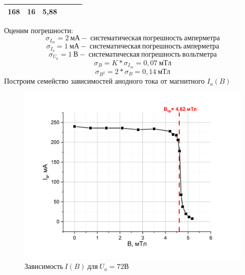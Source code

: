 \documentclass[a4paper,12pt]{article}
\begin{document}
\begin{table}[h]
\begin{center}
\begin{tabular}{|lll|lll|}
\multicolumn{1}{|l|}{168}                                              & \multicolumn{1}{l|}{16}                       & 5,88                     & \multicolumn{1}{l|}{}                         & \multicolumn{1}{l|}{}                         &                          \\ \hline
\end{tabular}
\end{center}
\end{table}

Оценим погрешности:
$$
\sigma_{I_m} = 2 \ мА - \ систематическая \ погрешность \ амперметра
$$
$$
\sigma_{I_а} = 1 \ мА - \ систематическая \ погрешность \ амперметра
$$
$$
\sigma_{U_a} = 1 \ В - \ систематическая \ погрешность \ вольтметра
$$
$$
\sigma_{B} = K * \sigma_{I_m} = 0,07 \ мТл
$$
$$
\sigma_{B^2} = 2*\sigma_{B} = 0,14 \ мТл
$$
Построим семейство зависимостей анодного тока от магнитного $I_a(B)$

\begin{figure}[h!]
	\begin{center}
	\includegraphics[scale=0.5]{graph3}
	\end{center}
	\caption{$Зависимость \ I(B) \ для \ U_a = 72В$}
	\end{figure}

\newpage
\end{document}
